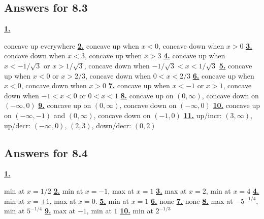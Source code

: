 \subsection *{Answers for 8.3}
\hypertarget {a:8.3.1}{\hyperlink {e:8.3.1}{\bfseries 1.}} \mdseries concave up everywhere\qquad 
\hypertarget {a:8.3.2}{\hyperlink {e:8.3.2}{\bfseries 2.}} \mdseries concave up when $x<0$, concave down when $x>0$\qquad 
\hypertarget {a:8.3.3}{\hyperlink {e:8.3.3}{\bfseries 3.}} \mdseries concave down when $x<3$, concave up when $x>3$\qquad 
\hypertarget {a:8.3.4}{\hyperlink {e:8.3.4}{\bfseries 4.}} \mdseries concave up when $x<-1/\sqrt 3$ or $x>1/\sqrt 3$, concave down when $-1/\sqrt 3<x<1/\sqrt 3$\qquad 
\hypertarget {a:8.3.5}{\hyperlink {e:8.3.5}{\bfseries 5.}} \mdseries concave up when $x<0$ or $x>2/3$, concave down when $0<x<2/3$\qquad 
\hypertarget {a:8.3.6}{\hyperlink {e:8.3.6}{\bfseries 6.}} \mdseries concave up when $x<0$, concave down when $x>0$\qquad 
\hypertarget {a:8.3.7}{\hyperlink {e:8.3.7}{\bfseries 7.}} \mdseries concave up when $x<-1$ or $x>1$, concave down when $-1<x<0$ or $0<x<1$\qquad 
\hypertarget {a:8.3.8}{\hyperlink {e:8.3.8}{\bfseries 8.}} \mdseries concave up on $(0,\infty )$, concave down on $(-\infty ,0)$\qquad 
\hypertarget {a:8.3.9}{\hyperlink {e:8.3.9}{\bfseries 9.}} \mdseries concave up on $(0,\infty )$, concave down on $(-\infty ,0)$\qquad 
\hypertarget {a:8.3.10}{\hyperlink {e:8.3.10}{\bfseries 10.}} \mdseries concave up on $(-\infty ,-1)$ and $(0,\infty )$, concave down on $(-1,0)$\qquad 
\hypertarget {a:8.3.11}{\hyperlink {e:8.3.11}{\bfseries 11.}} \mdseries up/incr: $(3,\infty )$, up/decr: $(-\infty ,0)$, $(2,3)$, down/decr: $(0,2)$\qquad 
\subsection *{Answers for 8.4}
\hypertarget {a:8.4.1}{\hyperlink {e:8.4.1}{\bfseries 1.}} \mdseries min at $x=1/2$\qquad 
\hypertarget {a:8.4.2}{\hyperlink {e:8.4.2}{\bfseries 2.}} \mdseries min at $x=-1$, max at $x=1$\qquad 
\hypertarget {a:8.4.3}{\hyperlink {e:8.4.3}{\bfseries 3.}} \mdseries max at $x=2$, min at $x=4$\qquad 
\hypertarget {a:8.4.4}{\hyperlink {e:8.4.4}{\bfseries 4.}} \mdseries min at $x=\pm 1$, max at $x=0$.\qquad 
\hypertarget {a:8.4.5}{\hyperlink {e:8.4.5}{\bfseries 5.}} \mdseries min at $x=1$\qquad 
\hypertarget {a:8.4.6}{\hyperlink {e:8.4.6}{\bfseries 6.}} \mdseries none\qquad 
\hypertarget {a:8.4.7}{\hyperlink {e:8.4.7}{\bfseries 7.}} \mdseries none\qquad 
\hypertarget {a:8.4.8}{\hyperlink {e:8.4.8}{\bfseries 8.}} \mdseries max at $-5^{-1/4}$, min at $5^{-1/4}$\qquad 
\hypertarget {a:8.4.9}{\hyperlink {e:8.4.9}{\bfseries 9.}} \mdseries max at $-1$, min at $1$\qquad 
\hypertarget {a:8.4.10}{\hyperlink {e:8.4.10}{\bfseries 10.}} \mdseries min at $2^{-1/3}$\qquad 
